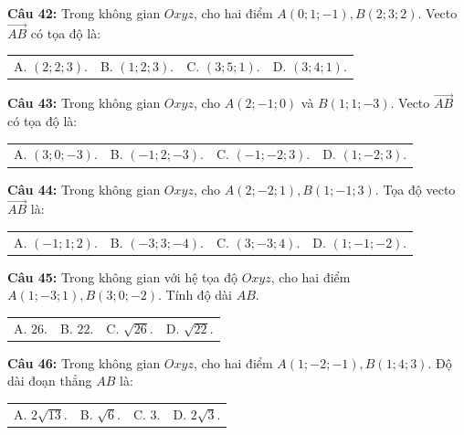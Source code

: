 \documentclass[12pt]{article}
\begin{document}
	\vspace{2mm}
	\noindent \textbf{Câu 42:} Trong không gian $Oxyz$, cho hai điểm $A(0; 1; -1), B(2; 3; 2)$. Vecto $\vec{AB}$ có tọa độ là: \\
	\noindent
	\begin{tabular}{p{} p{} p{} p{}}
		A. $(2; 2; 3)$. & B. $(1; 2; 3)$. & C. $(3; 5; 1)$. & D. $(3; 4; 1)$.
	\end{tabular}
	
	\vspace{2mm}
	\noindent \textbf{Câu 43:} Trong không gian $Oxyz$, cho $A(2; -1; 0)$ và $B(1; 1; -3)$. Vecto $\vec{AB}$ có tọa độ là: \\
	\noindent
	\begin{tabular}{p{} p{} p{} p{}}
		A. $(3; 0; -3)$. & B. $(-1; 2; -3)$. & C. $(-1; -2; 3)$. & D. $(1; -2; 3)$.
	\end{tabular}
	
	\vspace{2mm}
	\noindent \textbf{Câu 44:} Trong không gian $Oxyz$, cho $A(2; -2; 1), B(1; -1; 3)$. Tọa độ vecto $\vec{AB}$ là: \\
	\noindent
	\begin{tabular}{p{} p{} p{} p{}}
		A. $(-1; 1; 2)$. & B. $(-3; 3; -4)$. & C. $(3; -3; 4)$. & D. $(1; -1; -2)$.
	\end{tabular}
	
	\vspace{2mm}
	\noindent \textbf{Câu 45:} Trong không gian với hệ tọa độ $Oxyz$, cho hai điểm $A(1; -3; 1), B(3; 0; -2)$. Tính độ dài $AB$. \\
	\noindent
	\begin{tabular}{p{} p{} p{} p{}}
		A. $26$. & B. $22$. & C. $\sqrt{26}$. & D. $\sqrt{22}$.
	\end{tabular}
	
	\vspace{2mm}
	\noindent \textbf{Câu 46:} Trong không gian $Oxyz$, cho hai điểm $A(1; -2; -1), B(1; 4; 3)$. Độ dài đoạn thẳng $AB$ là: \\
	\noindent
	\begin{tabular}{p{} p{} p{} p{}}
		A. $2\sqrt{13}$. & B. $\sqrt{6}$. & C. $3$. & D. $2\sqrt{3}$.
	\end{tabular}
	
\end{document}
